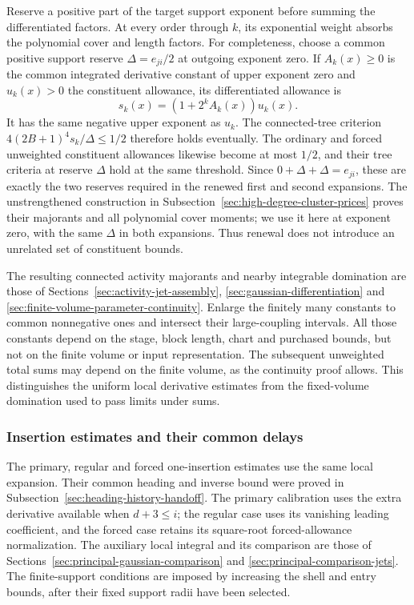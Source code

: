 Reserve a positive part of the target support exponent before
summing the differentiated factors. At every order through $k$,
its exponential weight absorbs the polynomial cover and length
factors. For completeness, choose a common positive support reserve
$\Delta=e_{ji}/2$ at outgoing exponent zero. If $A_k(x)\ge0$
is the common integrated derivative constant of upper exponent
zero and $u_k(x)>0$ the constituent allowance, its differentiated
allowance is
\[ s_k(x)=(1+2^kA_k(x))u_k(x). \]
It has the same negative upper exponent as $u_k$. The connected-tree
criterion $4(2B+1)^4s_k/\Delta\le1/2$ therefore holds eventually.
The ordinary and forced unweighted constituent allowances likewise
become at most $1/2$, and their tree criteria at reserve $\Delta$
hold at the same threshold. Since $0+\Delta+\Delta=e_{ji}$,
these are exactly the two reserves required in the renewed first
and second expansions. The unstrengthened construction in
Subsection~\ref{sec:high-degree-cluster-prices} proves their majorants
and all polynomial cover moments; we use it here at exponent zero,
with the same $\Delta$ in both expansions. Thus renewal does not
introduce an unrelated set of constituent bounds.

The resulting connected activity majorants and nearby
integrable domination are those of
Sections~\ref{sec:activity-jet-assembly},
\ref{sec:gaussian-differentiation} and
\ref{sec:finite-volume-parameter-continuity}. Enlarge the finitely
many constants to common nonnegative ones and intersect their
large-coupling intervals. All those constants depend on the stage,
block length, chart and purchased bounds, but not on the finite
volume or input representation. The subsequent unweighted total
sums may depend on the finite volume, as the continuity proof
allows. This distinguishes the uniform local derivative estimates
from the fixed-volume domination used to pass limits under sums.

\subsubsection{Insertion estimates and their common delays}
The primary, regular and forced one-insertion estimates use the
same local expansion. Their common heading and inverse bound were
proved in Subsection~\ref{sec:heading-history-handoff}. The primary
calibration uses the extra derivative available when $d+3\le i$;
the regular case uses its vanishing leading coefficient, and the
forced case retains its square-root forced-allowance normalization.
The auxiliary local integral and its comparison are those of
Sections~\ref{sec:principal-gaussian-comparison} and
\ref{sec:principal-comparison-jets}. The finite-support conditions
are imposed by increasing the shell and entry bounds, after their
fixed support radii have been selected.

